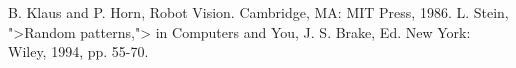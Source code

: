 %
%

\begin{thebibliography}{99}
\label{cha:literaturverzeichnis}


 B. Klaus and P. Horn, Robot Vision. Cambridge, MA: MIT Press, 1986.
 L. Stein, ">Random patterns,"> in Computers and You, J. S. Brake, Ed. New York: Wiley, 1994, pp. 55-70.



\end{thebibliography}
